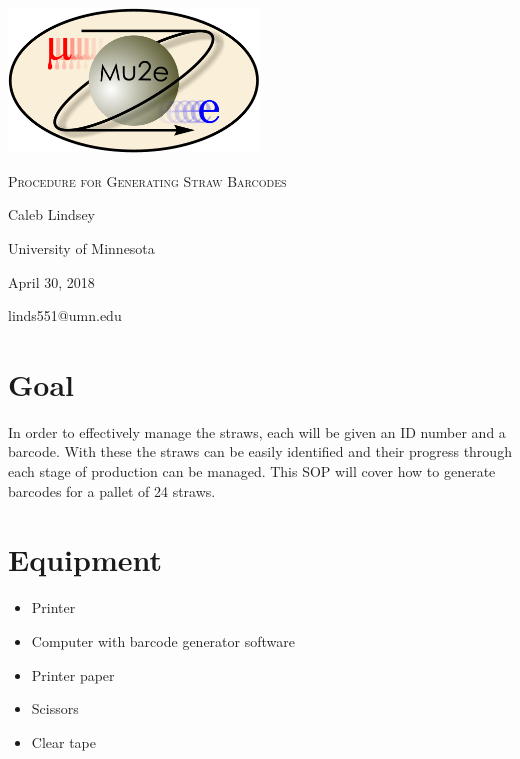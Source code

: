 \documentclass[letterpaper,12pt]{article}
\begin{document}
\begin{titlepage}
	\centering
	\includegraphics[width=0.5\textwidth]{mu2e_logo_oval.png}\par\vspace{2cm}
	{\scshape\LARGE Procedure for Generating Straw Barcodes\par}
	\vspace{3cm}
	{\Large Caleb Lindsey\par}
	\vspace{3cm}
	{\large University of Minnesota\par}
 	\vspace{.5cm}
	{\large April 30, 2018\par}
	\vfill
	{linds551@umn.edu\par}
\end{titlepage}

\clearpage
\setcounter{page}{2}

\newenvironment{myitemize} %
{ \begin{itemize}
    \setlength{\itemsep}{4pt}
    \setlength{\parskip}{0pt}
    \setlength{\parsep}{0pt}     }
{ \end{itemize}                  } 

\section{Goal}
In order to effectively manage the straws, each will be given an ID number and a barcode.  With these the straws can be easily identified and their progress through each stage of production can be managed.  This SOP will cover how to generate barcodes for a pallet of 24 straws.

\section{Equipment}

\begin{multicols}{2}
\begin{myitemize}
	\item Printer
    \item Computer with barcode generator software
    \item Printer paper
    \item Scissors
    \item Clear tape
\end{myitemize}
\end{multicols}
\end{document}
